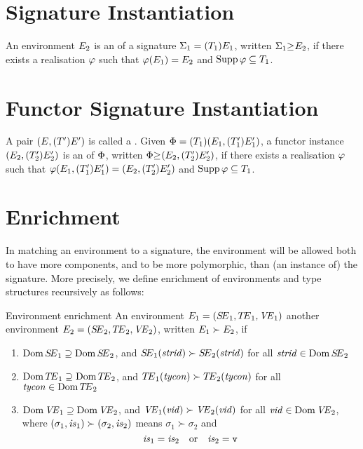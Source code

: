 \section{Signature Instantiation}

\begin{definition}{}
An environment $E_2$ is an  of a signature
$\Sigma_1=(T_{1})E_{1}$,
written $\Sigma_1 {\geq_{}} E_2$, if there exists a realisation
$\varphi$
such that $\varphi(E_1)=E_2$ and $\mathop{\rm Supp}\nolimits\varphi\subseteq T_1$.
\end{definition}

\section{Functor Signature Instantiation}

\begin{definition}{}
A pair $(E,(T')E')$ is called a .
Given $\Phi=(T_{1})(E_{1},(T_{1}')E_{1}')$,
a functor instance $(E_2,(T_2')E_2')$ is an  of
$\Phi$,
written $\Phi {\geq_{}} (E_2,(T_2')E_2')$,
if there exists a realisation $\varphi$
such that
$\varphi(E_1,(T_1')E_1')=(E_2,(T_2')E_2')$ and
$\mathop{\rm Supp}\nolimits\varphi\subseteq T_1$.
\end{definition}

\section{Enrichment}

\begin{clause}{}
In matching an environment to a signature, the environment will be
allowed both to have more components, and to be more polymorphic, than
(an instance of) the signature. More precisely, we define enrichment of
environments and type structures recursively as follows:
\end{clause}

\begin{definition}{Environment enrichment}
An environment $E_{1}=(\mbox{$S\!E$}_{1},\mbox{$T\!E$}_{1},\textit{V\kern-.05emE\/}_{1})$  another environment
$E_{2} = (\mbox{$S\!E$}_{2},\mbox{$T\!E$}_{2},\textit{V\kern-.05emE\/}_{2})$, written $E_1\succ E_2$,
if
\begin{enumerate}
\item $\mathop{\rm Dom}\nolimits\mbox{$S\!E$}_1\supseteq\mathop{\rm Dom}\nolimits\mbox{$S\!E$}_2$, and $\mbox{$S\!E$}_1(\textit{strid\/})\succ\mbox{$S\!E$}_2(\textit{strid\/})$
                                               for all $\textit{strid\/}\in\mathop{\rm Dom}\nolimits\mbox{$S\!E$}_2$
\item $\mathop{\rm Dom}\nolimits\mbox{$T\!E$}_1\supseteq\mathop{\rm Dom}\nolimits\mbox{$T\!E$}_2$, and $\mbox{$T\!E$}_1(\textit{tycon\/})\succ\mbox{$T\!E$}_2(\textit{tycon\/})$
                                               for all $\textit{tycon\/}\in\mathop{\rm Dom}\nolimits\mbox{$T\!E$}_2$
\item $\mathop{\rm Dom}\nolimits\textit{V\kern-.05emE\/}_1\supseteq\mathop{\rm Dom}\nolimits\textit{V\kern-.05emE\/}_2$, and $\textit{V\kern-.05emE\/}_1(\textit{vid\/})\succ\textit{V\kern-.05emE\/}_2(\textit{vid\/})$
                                               for all $\textit{vid\/}\in\mathop{\rm Dom}\nolimits\textit{V\kern-.05emE\/}_2$,
where $(\sigma_1,\textit{is\/}_1)\succ(\sigma_2,\textit{is\/}_2)$ means $\sigma_1\succ\sigma_2$ and
$$\textit{is\/}_1 = \textit{is\/}_2\quad\hbox{or}\quad \textit{is\/}_2 = \hbox{\tt v}$$
\end{enumerate}
\end{definition}

